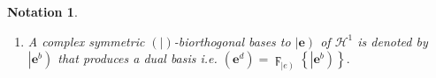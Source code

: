 \documentclass[aps,preprint]{revtex4}%
\newtheorem{notation}[theorem]{Notation}
\begin{document}
\begin{notation}
\begin{enumerate}
\begin{enumerate}
\item This gives%
\begin{align}
\mathbf{e}^{d}\left(  \mathbf{e}\right)   &  =\left(  \mathbf{e}^{d}\right)
^{t}\cdot\left(  \mathbf{e}\right)  =\left(  \left.  \mathbf{e}^{b}\right\vert
\mathbf{e}\right)  =\left(  \mathbf{e}^{b}\right\vert \cdot\left\vert
\mathbf{e}\right)  =\left(
\begin{array}
[c]{c}%
\left(  e_{1}^{b}\right\vert \\
\vdots\\
\left(  e_{r}^{b}\right\vert
\end{array}
\right)  \cdot\left(
\begin{array}
[c]{ccc}%
\left\vert e_{1}\right)  & \cdots & \left\vert e_{r}\right)
\end{array}
\right) \\
&  =\left\langle \left(  \mathbf{e}\right)  \left(  \left.  \mathbf{e}%
\right\vert \mathbf{e}\right)  ^{-1}\right\vert \cdot\left\vert \mathbf{e}%
\right)  =\left(  \left(  \left.  \mathbf{e}\right\vert \mathbf{e}\right)
^{-1}\left(  \mathbf{e}\right\vert \right)  \left\vert \mathbf{e}\right)
=\left(  \left.  \mathbf{e}\right\vert \mathbf{e}\right)  ^{-1}\left(  \left.
\mathbf{e}\right\vert \mathbf{e}\right)  =\mathbb{I}_{r}.
\end{align}

\end{enumerate}

\item A complex symmetric $\left(  \left.  {}\right\vert \right)
$-biorthogonal bases to $\left\vert \mathbf{e}\right)  $ of $\mathcal{H}^{1}$
is denoted by $\left\vert \mathbf{e}^{b}\right)  $ that produces a dual basis
i.e. $\left(  \mathbf{e}^{d}\right)  =\digamma_{\left\vert e\right)  }\left\{
\left\vert \mathbf{e}^{b}\right)  \right\}  .$


\end{enumerate}
\end{notation}
\end{document}
